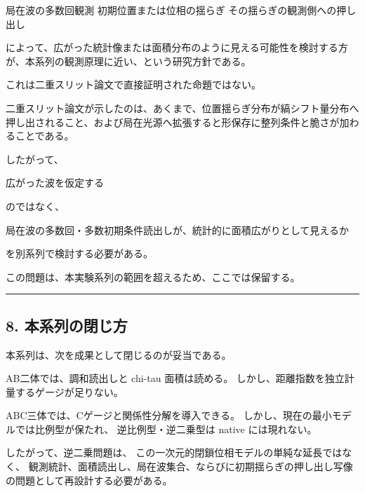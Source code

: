 \documentclass[
]{article}
\newenvironment{Shaded}{}{}
\newcommand{\NormalTok}[1]{#1}
\begin{document}
\begin{Shaded}
\begin{Highlighting}[]
\NormalTok{局在波の多数回観測}
\NormalTok{初期位置または位相の揺らぎ}
\NormalTok{その揺らぎの観測側への押し出し}
\end{Highlighting}
\end{Shaded}

によって、広がった統計像または面積分布のように見える可能性を検討する方が、本系列の観測原理に近い、という研究方針である。

これは二重スリット論文で直接証明された命題ではない。

二重スリット論文が示したのは、あくまで、位置揺らぎ分布が縞シフト量分布へ押し出されること、および局在光源へ拡張すると形保存に整列条件と脆さが加わることである。

したがって、

\begin{Shaded}
\begin{Highlighting}[]
\NormalTok{広がった波を仮定する}
\end{Highlighting}
\end{Shaded}

のではなく、

\begin{Shaded}
\begin{Highlighting}[]
\NormalTok{局在波の多数回・多数初期条件読出しが、統計的に面積広がりとして見えるか}
\end{Highlighting}
\end{Shaded}

を別系列で検討する必要がある。

この問題は、本実験系列の範囲を超えるため、ここでは保留する。

\begin{center}\rule{0.5\linewidth}{0.5pt}\end{center}

\subsection{8.
本系列の閉じ方}\label{ux672cux7cfbux5217ux306eux9589ux3058ux65b9}

本系列は、次を成果として閉じるのが妥当である。

\begin{Shaded}
\begin{Highlighting}[]
\NormalTok{AB二体では、調和読出しと chi{-}tau 面積は読める。}
\NormalTok{しかし、距離指数を独立計量するゲージが足りない。}

\NormalTok{ABC三体では、Cゲージと関係性分解を導入できる。}
\NormalTok{しかし、現在の最小モデルでは比例型が保たれ、}
\NormalTok{逆比例型・逆二乗型は native には現れない。}

\NormalTok{したがって、逆二乗問題は、}
\NormalTok{この一次元的閉鎖位相モデルの単純な延長ではなく、}
\NormalTok{観測統計、面積読出し、局在波集合、ならびに初期揺らぎの押し出し写像の問題として再設計する必要がある。}
\end{Highlighting}
\end{Shaded}
\end{document}
